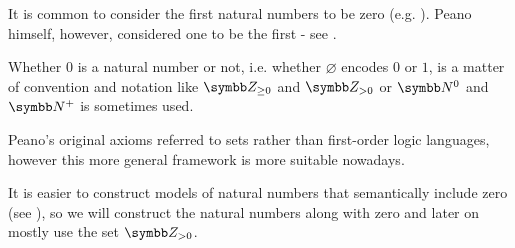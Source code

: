 
\begin{remark}\label{remark:peano_arithmetic_zero}
  It is common to consider the first natural numbers to be zero (e.g. \cite[67]{Enderton1977}). Peano himself, however, considered one to be the first - see \cite[1]{Peano1889}.

  Whether \( 0 \) is a natural number or not, i.e. whether \( \varnothing \) encodes \( 0 \) or \( 1 \), is a matter of convention and notation like \( \BZ_{\geq 0} \) and \( \BZ_{>0} \) or \( \BN^0 \) and \( \BN^+ \) is sometimes used.

  Peano's original axioms referred to sets rather than first-order logic languages, however this more general framework is more suitable nowadays.

  It is easier to construct models of natural numbers that semantically include zero (see ), so we will construct the natural numbers along with zero and later on mostly use the set \( \BZ_{>0} \).
\end{remark}

